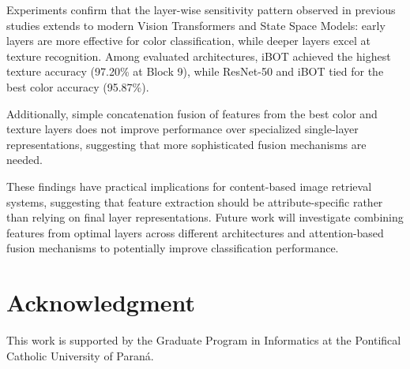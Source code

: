 \documentclass[conference]{IEEEtran}
\begin{document}
Experiments confirm that the layer-wise sensitivity pattern observed in previous studies extends to modern Vision Transformers and State Space Models: early layers are more effective for color classification, while deeper layers excel at texture recognition. Among evaluated architectures, iBOT achieved the highest texture accuracy (97.20\% at Block 9), while ResNet-50 and iBOT tied for the best color accuracy (95.87\%).

Additionally, simple concatenation fusion of features from the best color and texture layers does not improve performance over specialized single-layer representations, suggesting that more sophisticated fusion mechanisms are needed.

These findings have practical implications for content-based image retrieval systems, suggesting that feature extraction should be attribute-specific rather than relying on final layer representations. Future work will investigate combining features from optimal layers across different architectures and attention-based fusion mechanisms to potentially improve classification performance.


\section*{Acknowledgment}

This work is supported by the Graduate Program in Informatics at the Pontifical Catholic University of Paran\'{a}.
\end{document}
